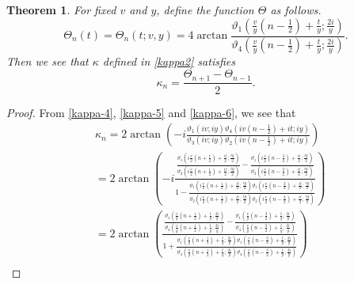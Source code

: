 \documentclass[10pt,leqno]{amsart}
\newtheorem{theorem}{Theorem}[section]
\numberwithin{equation}{section}
\begin{document}
\begin{theorem}\label{thm:kappa_and_potential}
For fixed $v$ and $y$, define the function $\Theta$ as follows.
\begin{equation}\label{sdm-2-2}
\Theta_{n}\left(t\right)=\Theta_{n}\left(t;v,y\right)=4\arctan\frac{\vartheta_1\left(\frac{v}{y}\left(n-\frac{1}{2}\right)+\frac{t}{y};\frac{2i}{y}\right)}{\vartheta_4\left(\frac{v}{y}\left(n-\frac{1}{2}\right)+\frac{t}{y};\frac{2i}{y}\right)}.
\end{equation}
Then we see that $\kappa$ defined in \eqref{kappa2} satisfies
\begin{equation}\label{kappa-3}
\kappa_{n}=\frac{\Theta_{n+1}-\Theta_{n-1}}{2}.
\end{equation}
\end{theorem}
\begin{proof}
    From \eqref{kappa-4}, \eqref{kappa-5} and \eqref{kappa-6}, we see that
\begin{equation}\label{kappa-7}
\begin{split}
&\kappa_{n}=2\arctan\left(-i\frac{\vartheta_1(iv; iy)\vartheta_4\left(iv\left(n-\frac{1}{2}\right)+it; iy\right)}{\vartheta_3(iv; iy)\vartheta_2\left(iv\left(n-\frac{1}{2}\right)+it; iy\right)}\right)\\
&=2\arctan\left(-i\frac{\frac{\vartheta_{1}\left(i\frac{v}{2}\left(n+\frac{1}{2}\right)+\frac{it}{2}; \frac{iy}{2}\right)}{\vartheta_{2}\left(i\frac{v}{2}\left(n+\frac{1}{2}\right)+\frac{it}{2}; \frac{iy}{2}\right)}-\frac{\vartheta_{1}\left(i\frac{v}{2}\left(n-\frac{3}{2}\right)+\frac{it}{2}; \frac{iy}{2}\right)}{\vartheta_{2}\left(i\frac{v}{2}\left(n-\frac{3}{2}\right)+\frac{it}{2}; \frac{iy}{2}\right)}}{1-\frac{\vartheta_{1}\left(i\frac{v}{2}\left(n+\frac{1}{2}\right)+\frac{it}{2}; \frac{iy}{2}\right)\vartheta_{1}\left(i\frac{v}{2}\left(n-\frac{3}{2}\right)+\frac{it}{2}; \frac{iy}{2}\right)}{\vartheta_{2}\left(i\frac{v}{2}\left(n+\frac{1}{2}\right)+\frac{it}{2}; \frac{iy}{2}\right)\vartheta_{2}\left(i\frac{v}{2}\left(n-\frac{3}{2}\right)+\frac{it}{2}; \frac{iy}{2}\right)}}\right)\\
&=2\arctan\left(\frac{\frac{\vartheta_{1}\left(\frac{v}{y}\left(n+\frac{1}{2}\right)+\frac{t}{y}; \frac{2i}{y}\right)}{\vartheta_{4}\left(\frac{v}{y}\left(n+\frac{1}{2}\right)+\frac{t}{y}; \frac{2i}{y}\right)}-\frac{\vartheta_{1}\left(\frac{v}{y}\left(n-\frac{3}{2}\right)+\frac{t}{y}; \frac{2i}{y}\right)}{\vartheta_{4}\left(\frac{v}{y}\left(n-\frac{3}{2}\right)+\frac{t}{y}; \frac{2i}{y}\right)}}{1+\frac{\vartheta_{1}\left(\frac{v}{y}\left(n+\frac{1}{2}\right)+\frac{t}{y}; \frac{2i}{y}\right)\vartheta_{1}\left(\frac{v}{y}\left(n-\frac{3}{2}\right)+\frac{t}{y}; \frac{2i}{y}\right)}{\vartheta_{4}\left(\frac{v}{y}\left(n+\frac{1}{2}\right)+\frac{t}{y}; \frac{2i}{y}\right)\vartheta_{4}\left(\frac{v}{y}\left(n-\frac{3}{2}\right)+\frac{t}{y}; \frac{2i}{y}\right)}}\right)\\

\end{split}
\end{equation}
\end{proof}
\end{document}
